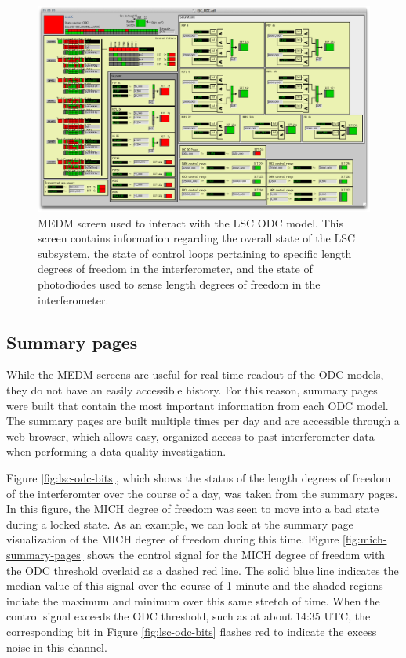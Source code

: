 \begin{figure}[ht!]
\includegraphics[width=\textwidth]{figures/ODC/LSC_screen}
\caption[LSC ODC Overview Screen]{MEDM screen used to interact with the LSC ODC model. %
         This screen contains information regarding the overall state of the LSC subsystem, %
         the state of control loops pertaining to specific length degrees of freedom in the %
         interferometer, and the state of photodiodes used to sense length degrees of freedom %
         in the interferometer.}
\label{fig:lsc-odc}
\end{figure}

\subsection{Summary pages}

While the MEDM screens are useful for real-time readout of the ODC models, they do not 
have an easily accessible history. For this reason, summary pages were built that 
contain the most important information from each ODC model. The summary pages are 
built multiple times per day and are accessible through a web browser, which allows 
easy, organized access to past interferometer data when performing a data 
quality investigation. 

Figure \ref{fig:lsc-odc-bits}, which shows the status of the length degrees of freedom 
of the interferomter over the course of a day, was taken from the summary pages. In this 
figure, the MICH degree of freedom was seen to move into a bad state during a locked state. 
As an example, we can look at the summary page visualization of the MICH degree of freedom 
during this time. 
Figure \ref{fig:mich-summary-pages} shows the control signal for the MICH degree of freedom 
with the ODC threshold 
overlaid as a dashed red line. The solid blue line indicates the median value of this signal 
over the course of 1 minute and the shaded regions indiate the maximum and minimum over 
this same stretch of time. When the control signal exceeds the ODC threshold, such as at 
about 14:35 UTC, the corresponding bit in Figure \ref{fig:lsc-odc-bits} flashes red to 
indicate the excess noise in this channel. 

